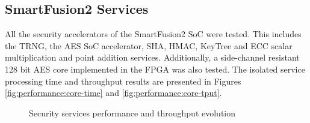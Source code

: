 \subsection{SmartFusion2 Services}\label{chap:evaluation:board}

All the security accelerators of the SmartFusion2 SoC were tested. This includes the TRNG, the AES SoC accelerator, SHA, HMAC, KeyTree and ECC scalar multiplication and point addition services.
Additionally, a side-channel resistant 128 bit AES core implemented in the FPGA was also tested.
The isolated service processing time and throughput results are presented in Figures \ref{fig:performance:core-time} and \ref{fig:performance:core-tput}.
\begin{figure}[h!]
	\centering     %
	\caption{Security services performance and throughput evolution}
\end{figure}

